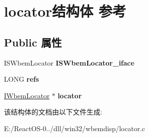 \hypertarget{structlocator}{}\section{locator结构体 参考}
\label{structlocator}
\subsection*{Public 属性}
\begin{DoxyCompactItemize}
\item 
\mbox{\label{structlocator_a6e55ad248d650a382fcc27fe3b25f30c}} 
I\+S\+Wbem\+Locator {\bfseries I\+S\+Wbem\+Locator\+\_\+iface}
\item 
\mbox{\label{structlocator_a0dea1264a27a84302653ef9f117c96db}} 
L\+O\+NG {\bfseries refs}
\item 
\mbox{\label{structlocator_abeb6a0cf6435acc32a15c057c4951e18}} 
\hyperlink{interface_i_wbem_locator}{I\+Wbem\+Locator} $\ast$ {\bfseries locator}
\end{DoxyCompactItemize}


该结构体的文档由以下文件生成\+:\begin{DoxyCompactItemize}
\item 
E\+:/\+React\+O\+S-\/0../dll/win32/wbemdisp/locator.\+c\end{DoxyCompactItemize}
